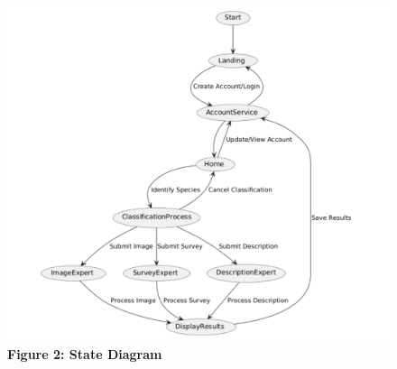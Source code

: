 \documentclass[]{article}
\begin{document}
\begin{figure}[H]
    \centering
    \includegraphics[scale=0.6]{2.2StateDiagram.png}
    \caption*{\textbf{Figure 2: State Diagram}} %
\end{figure}
\end{document}
